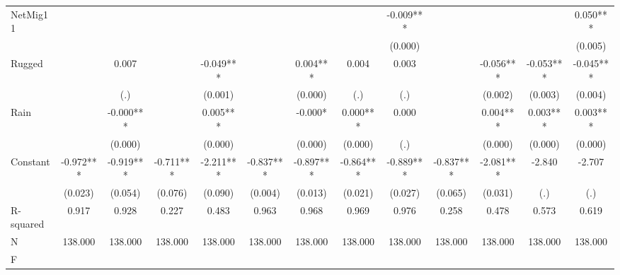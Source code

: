 {\begin{tabular}{l*{12}{c}}
NetMig11            &               &               &               &               &               &               &               &      -0.009***&               &               &               &       0.050***\\
                    &               &               &               &               &               &               &               &     (0.000)   &               &               &               &     (0.005)   \\
Rugged              &               &       0.007   &               &      -0.049***&               &       0.004***&       0.004   &       0.003   &               &      -0.056***&      -0.053***&      -0.045***\\
                    &               &         (.)   &               &     (0.001)   &               &     (0.000)   &         (.)   &         (.)   &               &     (0.002)   &     (0.003)   &     (0.004)   \\
Rain                &               &      -0.000***&               &       0.005***&               &      -0.000*  &       0.000***&       0.000   &               &       0.004***&       0.003***&       0.003***\\
                    &               &     (0.000)   &               &     (0.000)   &               &     (0.000)   &     (0.000)   &         (.)   &               &     (0.000)   &     (0.000)   &     (0.000)   \\
Constant            &      -0.972***&      -0.919***&      -0.711***&      -2.211***&      -0.837***&      -0.897***&      -0.864***&      -0.889***&      -0.837***&      -2.081***&      -2.840   &      -2.707   \\
                    &     (0.023)   &     (0.054)   &     (0.076)   &     (0.090)   &     (0.004)   &     (0.013)   &     (0.021)   &     (0.027)   &     (0.065)   &     (0.031)   &         (.)   &         (.)   \\
\hline
R-squared           &       0.917   &       0.928   &       0.227   &       0.483   &       0.963   &       0.968   &       0.969   &       0.976   &       0.258   &       0.478   &       0.573   &       0.619   \\
N                   &     138.000   &     138.000   &     138.000   &     138.000   &     138.000   &     138.000   &     138.000   &     138.000   &     138.000   &     138.000   &     138.000   &     138.000   \\
F                   &               &               &               &               &               &               &               &               &               &               &               &               \\
\hline\hline
\end{tabular}
}
